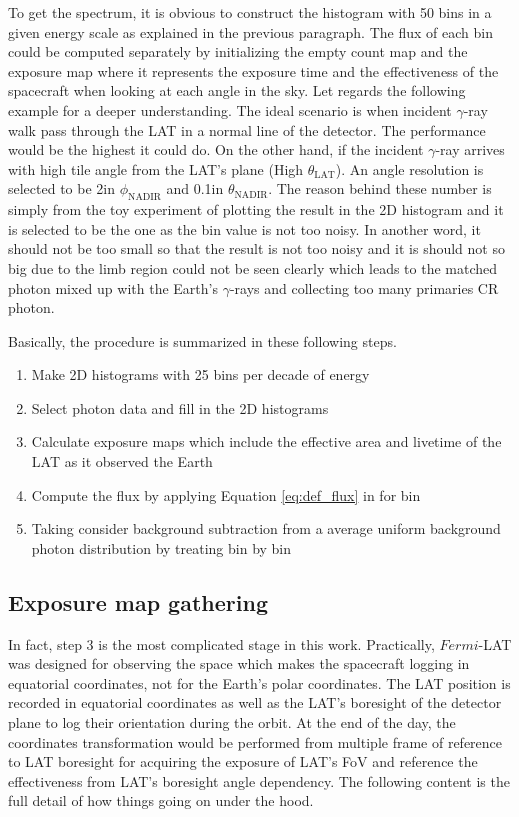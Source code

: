 To get the spectrum, it is obvious to construct the histogram 
with 50 bins in a given energy scale as explained in the previous paragraph.
The flux of each bin could be computed separately by initializing 
the empty count map and the exposure map where it represents the
exposure time and the effectiveness of the spacecraft when looking 
at each angle in the sky. Let regards the following example for 
a deeper understanding. The ideal scenario is when incident $\gamma$-ray
walk pass through the LAT in a normal line of the detector. 
The performance would be the highest it could do.
On the other hand, if the incident $\gamma$-ray arrives with high 
tile angle from the LAT's plane (High $\theta_\text{LAT}$).
An angle resolution is selected to be 2\textdegree in $\phi_\text{NADIR}$
and 0.1\textdegree in $\theta_\text{NADIR}$. The reason behind these 
number is simply from the toy experiment of plotting the result 
in the 2D histogram and it is selected to be the one as the bin value 
is not too noisy. In another word, it should not be too small so that 
the result is not too noisy and it is should not so big due to the 
limb region could not be seen clearly which leads to the matched photon 
mixed up with the Earth's $\gamma$-rays and collecting too many primaries 
CR photon.


Basically, the procedure is summarized in these following steps.
\begin{enumerate}
    \item Make 2D histograms with 25 bins per decade of energy
    \item Select photon data and fill in the 2D histograms
    \item Calculate exposure maps which include the effective area
    and livetime of the LAT as it observed the Earth    
    \item Compute the flux by applying Equation \ref{eq:def_flux} in for bin 
    \item Taking consider background subtraction from a average
    uniform background photon distribution by treating bin by bin 
\end{enumerate}


\subsection{Exposure map gathering}
In fact, step 3 is the most complicated stage in this work.
Practically, $Fermi$-LAT was designed for observing the space which
makes the spacecraft logging in equatorial coordinates, not for the 
Earth's polar coordinates. The LAT position is recorded in equatorial coordinates as well as the LAT's boresight of the detector
plane to log their orientation during the orbit. At the end of the day,
the coordinates transformation would be performed from multiple frame 
of reference to LAT boresight for acquiring the exposure of LAT's FoV
and reference the effectiveness from LAT's boresight angle dependency.
The following content is the full detail of how things going on 
under the hood.

